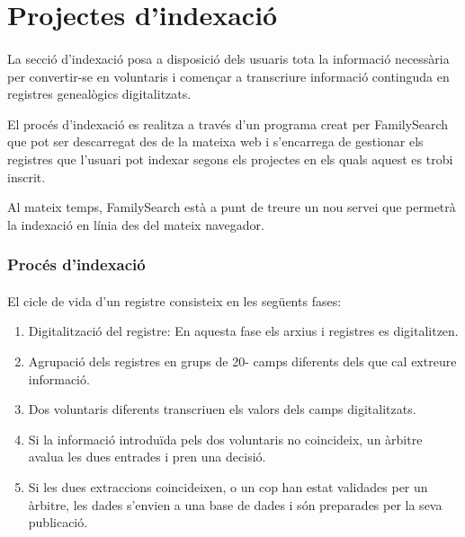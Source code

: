 \section{Projectes d'indexació}

    \paragraph{}
    La secció d’indexació posa a disposició dels usuaris tota la informació necessària per convertir-se en voluntaris i començar a transcriure informació continguda en registres genealògics digitalitzats.

    El procés d’indexació es realitza a través d’un programa creat per FamilySearch que pot ser descarregat des de la mateixa web i s’encarrega de gestionar els registres que l’usuari pot indexar segons els projectes en els quals aquest es trobi inscrit.

    Al mateix temps, FamilySearch està a punt de treure un nou servei que permetrà la indexació en línia des del mateix navegador.


    \subsubsection{Procés d'indexació}

        \paragraph{}
        El cicle de vida d’un registre consisteix en les següents fases:

        \begin{enumerate}
            \item Digitalització del registre: En aquesta fase els arxius i registres es digitalitzen.
            \item Agrupació dels registres en grups de 20- camps diferents dels que cal extreure informació.
            \item Dos voluntaris diferents transcriuen els valors dels camps digitalitzats.
            \item Si la informació introduïda pels dos voluntaris no coincideix, un àrbitre avalua les dues entrades i pren una decisió.
            \item Si les dues extraccions coincideixen, o un cop han estat validades per un àrbitre, les dades s’envien a una base de dades i són preparades per la seva publicació.
        \end{enumerate}

